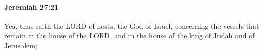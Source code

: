 
		\paragraph{Jeremiah 27:21} %
			\label{JEREMIAH-27-21}

			Yea, thus saith the LORD of hosts, the God of Israel, concerning the vessels that remain in the house of the LORD, and in the house of the king of Judah and of Jerusalem;


